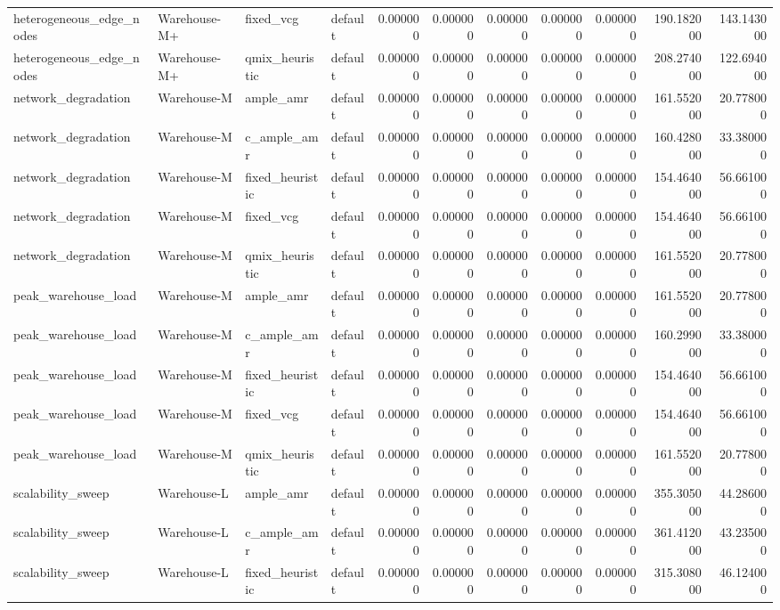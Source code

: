 \begin{tabular}{llllrrrrrrr}
heterogeneous_edge_nodes & Warehouse-M+ & fixed_vcg & default & 0.000000 & 0.000000 & 0.000000 & 0.000000 & 0.000000 & 190.182000 & 143.143000 \\
heterogeneous_edge_nodes & Warehouse-M+ & qmix_heuristic & default & 0.000000 & 0.000000 & 0.000000 & 0.000000 & 0.000000 & 208.274000 & 122.694000 \\
network_degradation & Warehouse-M & ample_amr & default & 0.000000 & 0.000000 & 0.000000 & 0.000000 & 0.000000 & 161.552000 & 20.778000 \\
network_degradation & Warehouse-M & c_ample_amr & default & 0.000000 & 0.000000 & 0.000000 & 0.000000 & 0.000000 & 160.428000 & 33.380000 \\
network_degradation & Warehouse-M & fixed_heuristic & default & 0.000000 & 0.000000 & 0.000000 & 0.000000 & 0.000000 & 154.464000 & 56.661000 \\
network_degradation & Warehouse-M & fixed_vcg & default & 0.000000 & 0.000000 & 0.000000 & 0.000000 & 0.000000 & 154.464000 & 56.661000 \\
network_degradation & Warehouse-M & qmix_heuristic & default & 0.000000 & 0.000000 & 0.000000 & 0.000000 & 0.000000 & 161.552000 & 20.778000 \\
peak_warehouse_load & Warehouse-M & ample_amr & default & 0.000000 & 0.000000 & 0.000000 & 0.000000 & 0.000000 & 161.552000 & 20.778000 \\
peak_warehouse_load & Warehouse-M & c_ample_amr & default & 0.000000 & 0.000000 & 0.000000 & 0.000000 & 0.000000 & 160.299000 & 33.380000 \\
peak_warehouse_load & Warehouse-M & fixed_heuristic & default & 0.000000 & 0.000000 & 0.000000 & 0.000000 & 0.000000 & 154.464000 & 56.661000 \\
peak_warehouse_load & Warehouse-M & fixed_vcg & default & 0.000000 & 0.000000 & 0.000000 & 0.000000 & 0.000000 & 154.464000 & 56.661000 \\
peak_warehouse_load & Warehouse-M & qmix_heuristic & default & 0.000000 & 0.000000 & 0.000000 & 0.000000 & 0.000000 & 161.552000 & 20.778000 \\
scalability_sweep & Warehouse-L & ample_amr & default & 0.000000 & 0.000000 & 0.000000 & 0.000000 & 0.000000 & 355.305000 & 44.286000 \\
scalability_sweep & Warehouse-L & c_ample_amr & default & 0.000000 & 0.000000 & 0.000000 & 0.000000 & 0.000000 & 361.412000 & 43.235000 \\
scalability_sweep & Warehouse-L & fixed_heuristic & default & 0.000000 & 0.000000 & 0.000000 & 0.000000 & 0.000000 & 315.308000 & 46.124000 \\

\end{tabular}
